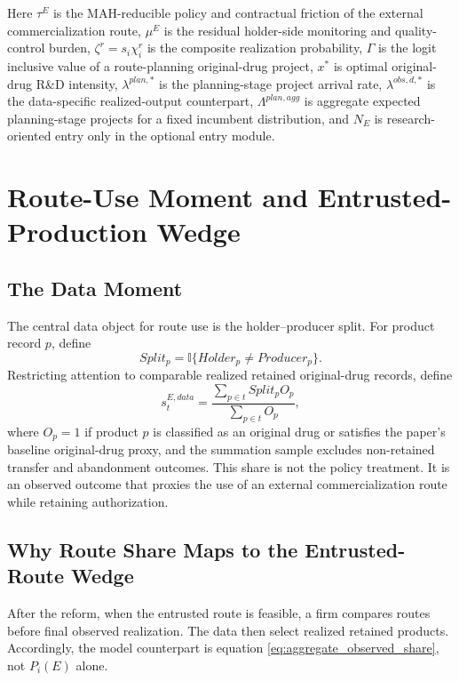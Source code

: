 \documentclass[12pt]{article}
\newcommand{\1}{\mathbf{1}}
\newcommand{\ind}{\mathbb{I}}
\begin{document}
Here $\tau^E$ is the MAH-reducible policy and contractual friction of the external commercialization route, $\mu^E$ is the residual holder-side monitoring and quality-control burden, $\zeta^r=s_i\chi_i^r$ is the composite realization probability, $\Gamma$ is the logit inclusive value of a route-planning original-drug project, $x^*$ is optimal original-drug R\&D intensity, $\lambda^{plan,*}$ is the planning-stage project arrival rate, $\lambda^{obs,d,*}$ is the data-specific realized-output counterpart, $\Lambda^{plan,agg}$ is aggregate expected planning-stage projects for a fixed incumbent distribution, and $N_E$ is research-oriented entry only in the optional entry module.

\section{Route-Use Moment and Entrusted-Production Wedge}

\subsection{The Data Moment}

The central data object for route use is the holder--producer split. For product record $p$, define
\[
    Split_p = \ind\{Holder_p \neq Producer_p\}.
\]
Restricting attention to comparable realized retained original-drug records, define
\[
    s_t^{E,data}
    =
    \frac{\sum_{p\in t} Split_p O_p}
    {\sum_{p\in t} O_p},
\]
where $O_p=1$ if product $p$ is classified as an original drug or satisfies the paper's baseline original-drug proxy, and the summation sample excludes non-retained transfer and abandonment outcomes. This share is not the policy treatment. It is an observed outcome that proxies the use of an external commercialization route while retaining authorization.

\subsection{Why Route Share Maps to the Entrusted-Route Wedge}

After the reform, when the entrusted route is feasible, a firm compares routes before final observed realization. The data then select realized retained products. Accordingly, the model counterpart is equation \eqref{eq:aggregate_observed_share}, not $P_i(E)$ alone.
\end{document}
